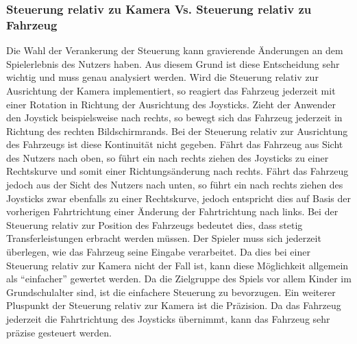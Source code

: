 	\subsubsection{Steuerung relativ zu Kamera Vs. Steuerung relativ zu Fahrzeug}
    Die Wahl der Verankerung der Steuerung kann gravierende Änderungen an dem Spielerlebnis des Nutzers haben. Aus diesem Grund ist diese Entscheidung sehr wichtig und muss genau analysiert werden.
    Wird die Steuerung relativ zur Ausrichtung der Kamera implementiert, so reagiert das Fahrzeug jederzeit mit einer Rotation in Richtung der Ausrichtung des Joysticks. Zieht der Anwender den Joystick beispielsweise nach rechts, so bewegt sich das Fahrzeug jederzeit in Richtung des rechten Bildschirmrands. Bei der Steuerung relativ zur Ausrichtung des Fahrzeugs ist diese Kontinuität nicht gegeben. Fährt das Fahrzeug aus Sicht des Nutzers nach oben, so führt ein nach rechts ziehen des Joysticks zu einer Rechtskurve und somit einer Richtungsänderung nach rechts.
    Fährt das Fahrzeug jedoch aus der Sicht des Nutzers nach unten, so führt ein nach rechts ziehen des Joysticks zwar ebenfalls zu einer Rechtskurve, jedoch entspricht dies auf Basis der vorherigen Fahrtrichtung einer Änderung der Fahrtrichtung nach links.
    Bei der Steuerung relativ zur Position des Fahrzeugs bedeutet dies, dass stetig Transferleistungen erbracht werden müssen. Der Spieler muss sich jederzeit überlegen, wie das Fahrzeug seine Eingabe verarbeitet. Da dies bei einer Steuerung relativ zur Kamera nicht der Fall ist, kann diese Möglichkeit allgemein als \enquote{einfacher} gewertet werden. Da die Zielgruppe des Spiels vor allem Kinder im Grundschulalter sind, ist die einfachere Steuerung zu bevorzugen. Ein weiterer Pluspunkt der Steuerung relativ zur Kamera ist die Präzision. Da das Fahrzeug jederzeit die Fahrtrichtung des Joysticks übernimmt, kann das Fahrzeug sehr präzise gesteuert werden.

